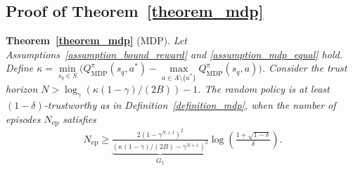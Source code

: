 \documentclass[10pt]{article}
\begin{document}
\subsection{Proof of Theorem~\ref{theorem_mdp}}
\label{appendix_omit_proof_theorem_mdp}
\textbf{Theorem~\ref{theorem_mdp}} (MDP).
\textit{
Let Assumptions~\ref{assumption_bound_reward} and \ref{assumption_mdp_equal} hold.
 Define $\kappa = \min\limits_{s_q \in S} \big( Q_\text{MDP}^\pi(s_q, a^*) - \max\limits_{a \in A \setminus \{a^*\}} Q_\text{MDP}^\pi(s_q, a) \big)$. Consider the trust horizon $N > \log_\gamma \left( \kappa (1-\gamma)/(2B) \right)-1$. The random policy is at least $(1-\delta)$-trustworthy as in Definition~\ref{definition_mdp}, when the number of episodes $N_\text{ep}$ satisfies
\begin{align}
    N_\text{ep}  \geq \underbrace{ \frac{ 2 \left( 1-\gamma^{N+1}\right)^2}{ \left( \kappa \left( 1-\gamma \right) / (2B) - \gamma^{N+1}\right)^2} }_{G_1}   \log \left( \frac{1+\sqrt{1-\delta}}{\delta} \right).
\end{align}
}
\end{document}
